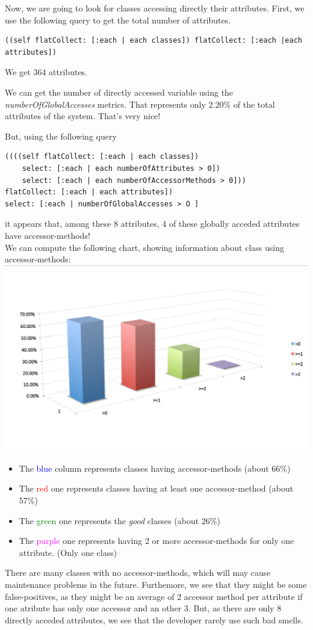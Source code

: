 \documentclass[11pt,a4paper]{article}
\begin{document}
Now, we are going to look for classes accessing directly their attributes. First, we use the following query to get the total number of attributes.
\begin{lstlisting}
((self flatCollect: [:each | each classes]) flatCollect: [:each |each attributes])
\end{lstlisting}
We get 364 attributes.

We can get the number of directly accessed variable using the \textit{numberOfGlobalAccesses} metrics. That represents only $2.20\%$ of the total attributes of the system. That's very nice!

But, using the following query\\
\begin{lstlisting}
((((self flatCollect: [:each | each classes])
	select: [:each | each numberOfAttributes > 0])
	select: [:each | each numberOfAccessorMethods > 0]))
flatCollect: [:each | each attributes])
select: [:each | numberOfGlobalAccesses > O ]
\end{lstlisting}
it appears that, among these 8 attributes, 4 of these globally acceded attributes have accessor-methods!\\

We can compute the following chart, showing information about class using accessor-methods:\\
\includegraphics[width=\textwidth]{accessor.png}
\begin{itemize} 
\item The \textcolor{blue}{blue} column represents classes having accessor-methods (about 66\%)
\item The \textcolor{red}{red} one represents classes having at least one accessor-method (about 57\%)
\item The \textcolor{green}{green} one represents the \textit{good} classes (about 26\%)
\item The \textcolor{magenta}{purple} one represents having 2 or more accessor-methods for only one attribute. (Only one class)
\end{itemize}
There are many classes with no accessor-methods, which will may cause maintenance problems in the future. Furthemore, we see that they might be some false-positives, as they might be an average of 2 accessor method per attribute if one atribute has only one accessor and an other 3. But, as there are only 8 directly acceded attributes, we see that the developer rarely use such bad smells.  
\end{document}
